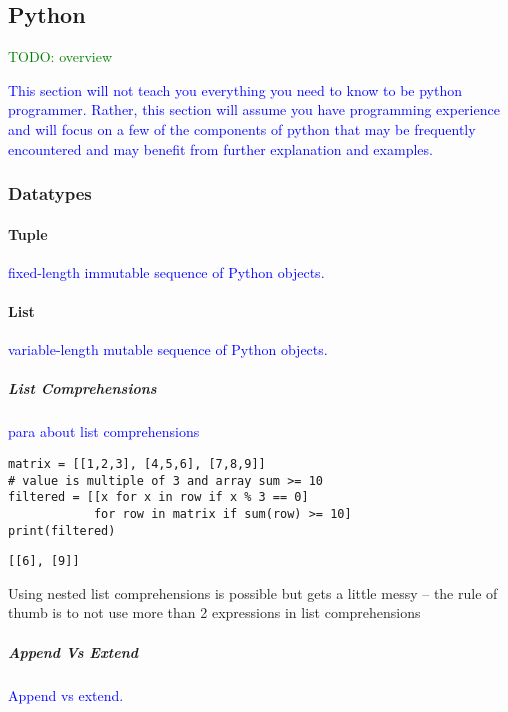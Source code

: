 \subsection{Python}

\textcolor{green}{TODO: overview}

\textcolor{blue}{This section will not teach you everything you need to know to be python programmer. Rather, this section will assume you have programming experience and will focus on a few of the components of python that may be frequently encountered and may benefit from further explanation and examples.}


\subsubsection{Datatypes}

\paragraph{Tuple}

\textcolor{blue}{fixed-length immutable sequence of Python objects.}

\paragraph{List}

\textcolor{blue}{variable-length mutable sequence of Python objects.}

\subparagraph{List Comprehensions}

\textcolor{blue}{para about list comprehensions}

\begin{lstlisting}[style=pyInStyle]
matrix = [[1,2,3], [4,5,6], [7,8,9]]
# value is multiple of 3 and array sum >= 10
filtered = [[x for x in row if x % 3 == 0]
            for row in matrix if sum(row) >= 10]
print(filtered)
\end{lstlisting}
\begin{lstlisting}[style=pyOutStyle]
[[6], [9]]
\end{lstlisting}
\begin{markdown}
Using nested list comprehensions is possible but gets a little messy -- the rule of thumb is to not use more than 2 expressions in list comprehensions
\end{markdown}

\subparagraph{Append Vs Extend}

\textcolor{blue}{Append vs extend.}


